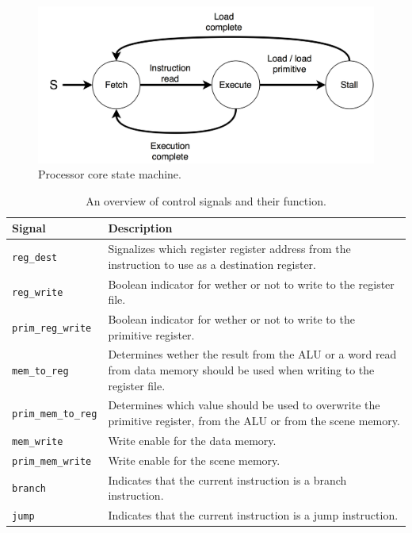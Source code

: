 \begin{figure}[h!]
    \centering
    \includegraphics[width=0.6\linewidth]{images/state-machine.png}
    \caption{Processor core state machine.}
    \label{fig:state-machine}
\end{figure}

\begin{table}
    \begin{tabular}{|p{5cm}|p{7cm}|}
        \hline
        Signal             & Description                                                                                                                 \\ \hline
        \texttt{reg\_dest}          & Signalizes which register register address from the instruction to use as a destination register.                           \\ \hline
        \texttt{reg\_write}         & Boolean indicator for wether or not to write to the register file.                                                          \\ \hline
        \texttt{prim\_reg\_write}   & Boolean indicator for wether or not to write to the primitive register.                                                     \\ \hline
        \texttt{mem\_to\_reg}       & Determines wether the result from the ALU or a word read from data memory should be used when writing to the register file. \\ \hline
        \texttt{prim\_mem\_to\_reg} & Determines which value should be used to overwrite the primitive register, from the ALU or from the scene memory.           \\ \hline
        \texttt{mem\_write}         & Write enable for the data memory.                                                                                           \\ \hline
        \texttt{prim\_mem\_write}   & Write enable for the scene memory.                                                                                          \\ \hline
        \texttt{branch}             & Indicates that the current instruction is a branch instruction.                                                             \\ \hline
        \texttt{jump}               & Indicates that the current instruction is a jump instruction.                                                               \\ \hline
    \end{tabular}
    \caption{An overview of control signals and their function.}
    \label{tbl:control-signals}
\end{table}

